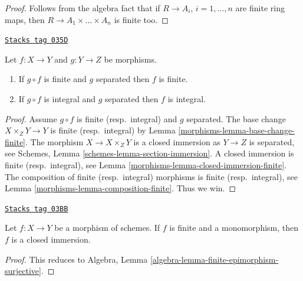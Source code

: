 \begin{proof}
Follows from the algebra fact that if $R \to A_i$, $i = 1, \ldots, n$
are finite ring maps, then $R \to A_1 \times \ldots \times A_n$ is finite too.
\end{proof}

\begin{lemma}
\label{morphisms-lemma-finite-permanence}
\href{https://stacks.math.columbia.edu/tag/035D}{\texttt{Stacks tag 035D}}

Let $f : X \to Y$ and $g : Y \to Z$ be morphisms.
\begin{enumerate}
\item If $g \circ f$ is finite and $g$ separated then $f$ is finite.
\item If $g \circ f$ is integral and $g$ separated then $f$ is integral.
\end{enumerate}
\end{lemma}

\begin{proof}

Assume $g \circ f$ is finite (resp.\ integral) and $g$ separated.
The base change $X \times_Z Y \to Y$ is finite (resp.\ integral) by
Lemma \ref{morphisms-lemma-base-change-finite}.
The morphism $X \to X \times_Z Y$ is
a closed immersion as $Y \to Z$ is separated, see
Schemes, Lemma \ref{schemes-lemma-section-immersion}.
A closed immersion is finite (resp.\ integral),
see Lemma \ref{morphisms-lemma-closed-immersion-finite}.
The composition of finite (resp.\ integral) morphisms is finite
(resp.\ integral),
see Lemma \ref{morphisms-lemma-composition-finite}. Thus we win.
\end{proof}

\begin{lemma}
\label{morphisms-lemma-finite-monomorphism-closed}
\href{https://stacks.math.columbia.edu/tag/03BB}{\texttt{Stacks tag 03BB}}

Let $f : X \to Y$ be a morphism of schemes.
If $f$ is finite and a monomorphism, then $f$ is a closed immersion.
\end{lemma}

\begin{proof}
This reduces to
Algebra, Lemma \ref{algebra-lemma-finite-epimorphism-surjective}.
\end{proof}

